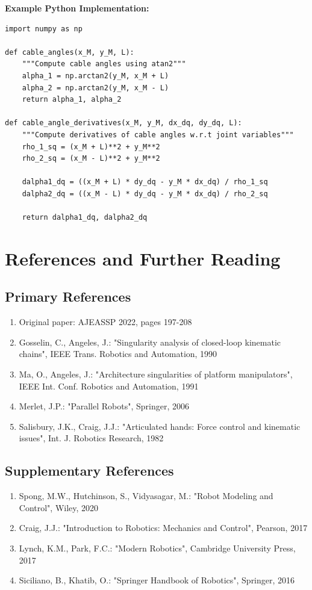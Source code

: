 \documentclass[11pt,a4paper]{article}
\begin{document}
\textbf{Example Python Implementation:}
\begin{verbatim}
import numpy as np

def cable_angles(x_M, y_M, L):
    """Compute cable angles using atan2"""
    alpha_1 = np.arctan2(y_M, x_M + L)
    alpha_2 = np.arctan2(y_M, x_M - L)
    return alpha_1, alpha_2

def cable_angle_derivatives(x_M, y_M, dx_dq, dy_dq, L):
    """Compute derivatives of cable angles w.r.t joint variables"""
    rho_1_sq = (x_M + L)**2 + y_M**2
    rho_2_sq = (x_M - L)**2 + y_M**2
    
    dalpha1_dq = ((x_M + L) * dy_dq - y_M * dx_dq) / rho_1_sq
    dalpha2_dq = ((x_M - L) * dy_dq - y_M * dx_dq) / rho_2_sq
    
    return dalpha1_dq, dalpha2_dq
\end{verbatim}

\section{References and Further Reading}

\subsection{Primary References}
\begin{enumerate}
\item Original paper: AJEASSP 2022, pages 197-208
\item Gosselin, C., Angeles, J.: "Singularity analysis of closed-loop kinematic chains", IEEE Trans. Robotics and Automation, 1990
\item Ma, O., Angeles, J.: "Architecture singularities of platform manipulators", IEEE Int. Conf. Robotics and Automation, 1991
\item Merlet, J.P.: "Parallel Robots", Springer, 2006
\item Salisbury, J.K., Craig, J.J.: "Articulated hands: Force control and kinematic issues", Int. J. Robotics Research, 1982
\end{enumerate}

\subsection{Supplementary References}
\begin{enumerate}
\item Spong, M.W., Hutchinson, S., Vidyasagar, M.: "Robot Modeling and Control", Wiley, 2020
\item Craig, J.J.: "Introduction to Robotics: Mechanics and Control", Pearson, 2017
\item Lynch, K.M., Park, F.C.: "Modern Robotics", Cambridge University Press, 2017
\item Siciliano, B., Khatib, O.: "Springer Handbook of Robotics", Springer, 2016
\end{enumerate}
\end{document}
